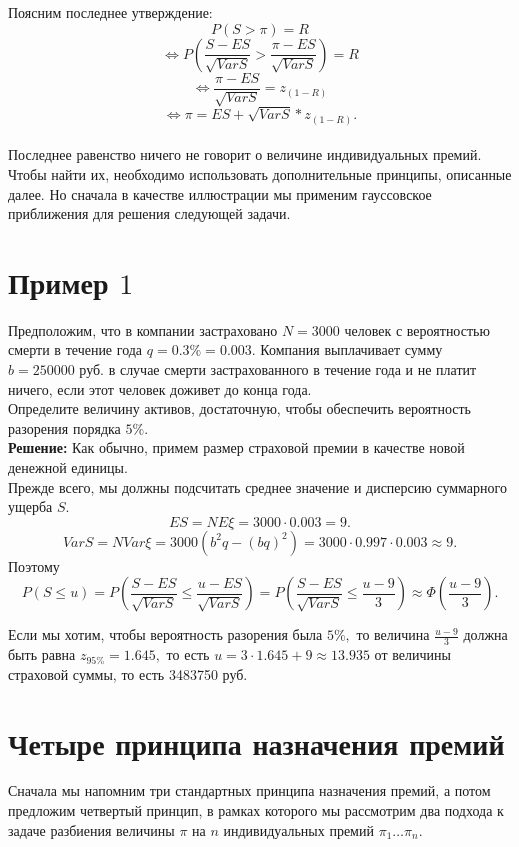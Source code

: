 \documentclass[12pt,a4paper]{article}
\begin{document}
Поясним последнее утверждение: 
$$P(S>\pi)=R $$
$$\Leftrightarrow P(\frac{S-ES}{\sqrt{VarS}} > \frac{\pi-ES}{\sqrt{VarS}})=R $$
$$\Leftrightarrow \frac{\pi-ES}{\sqrt{VarS}}=z_{(1-R)}$$
$$ \Leftrightarrow \pi=ES + \sqrt{VarS}*z_{(1-R)}.$$\\

Последнее равенство ничего не говорит о величине индивидуальных премий. Чтобы найти их, необходимо использовать дополнительные принципы, описанные далее. 
Но сначала в качестве иллюстрации мы применим гауссовское приближения для решения следующей задачи. \\

\section{ Пример $1$}
 Предположим, что в компании застраховано $N=3000$ человек с вероятностью смерти в течение года $q=0.3\% = 0.003.$ 
Компания выплачивает сумму $b = 250000$ руб. в случае смерти застрахованного в течение года и не платит ничего, если этот человек доживет до конца года.\\
Определите величину активов, достаточную, чтобы обеспечить вероятность разорения порядка $5\%.$\\

{\bf Решение:} Как обычно, примем размер страховой премии в качестве новой денежной единицы.\\
Прежде всего, мы должны подсчитать среднее значение и дисперсию суммарного ущерба $S.$\\
$$ES = N E \xi = 3000 \cdot 0.003 = 9.$$
$$VarS = N Var \xi = 3000(b^2q - (bq)^2) = 3000 \cdot 0.997 \cdot 0.003 \approx 9.$$
Поэтому 
$$P(S \leq u) = P\left( \frac{S-ES}{\sqrt{VarS}} \leq  \frac{u-ES}{\sqrt{VarS}} \right) 
=  P\left( \frac{S-ES}{\sqrt{VarS}} \leq  \frac{u-9}{3} \right) \approx \Phi\left( \frac{u-9}{3} \right).$$

Если мы хотим, чтобы вероятность разорения была $5\%,$ то величина $\frac{u-9}{3}$ 
должна быть равна $z_{95\%} = 1.645,$ то есть $u=3\cdot 1.645 + 9 \approx 13.935$ от величины страховой суммы, то есть 3483750 руб.


{   \section{ Четыре принципа назначения премий }} 


Сначала мы напомним три стандартных принципа назначения премий, а потом предложим четвертый принцип, в рамках которого 
 мы рассмотрим два подхода к задаче разбиения величины $\pi$ на $n$ индивидуальных премий $\pi_1 \ldots \pi_n.$ \\
 
\end{document}
